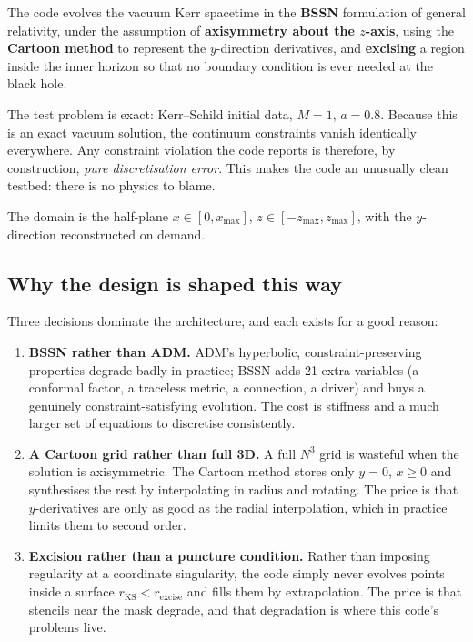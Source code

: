 The code evolves the vacuum Kerr spacetime in the \textbf{BSSN} formulation of
general relativity, under the assumption of \textbf{axisymmetry about the
$z$-axis}, using the \textbf{Cartoon method} to represent the $y$-direction
derivatives, and \textbf{excising} a region inside the inner horizon so that no
boundary condition is ever needed at the black hole.

The test problem is exact: Kerr--Schild initial data, $M=1$, $a=0.8$. Because
this is an exact vacuum solution, the continuum constraints vanish identically
everywhere. Any constraint violation the code reports is therefore, by
construction, \emph{pure discretisation error}. This makes the code an
unusually clean testbed: there is no physics to blame.

The domain is the half-plane $x \in [0, x_{\max}]$, $z \in [-z_{\max},
z_{\max}]$, with the $y$-direction reconstructed on demand.

\subsection{Why the design is shaped this way}

Three decisions dominate the architecture, and each exists for a good reason:

\begin{enumerate}
\item \textbf{BSSN rather than ADM.} ADM's hyperbolic, constraint-preserving
      properties degrade badly in practice; BSSN adds 21 extra variables (a
      conformal factor, a traceless metric, a connection, a driver) and buys a
      genuinely constraint-satisfying evolution. The cost is stiffness and a
      much larger set of equations to discretise consistently.
\item \textbf{A Cartoon grid rather than full 3D.} A full
      $N^3$ grid is wasteful when the solution is axisymmetric. The Cartoon
      method stores only $y=0$, $x \geq 0$ and synthesises the rest by
      interpolating in radius and rotating. The price is that $y$-derivatives
      are only as good as the radial interpolation, which in practice limits
      them to second order.
\item \textbf{Excision rather than a puncture condition.} Rather than imposing
      regularity at a coordinate singularity, the code simply never evolves
      points inside a surface $r_{\mathrm{KS}} < r_{\mathrm{excise}}$ and
      fills them by extrapolation. The price is that stencils near the mask
      degrade, and that degradation is where this code's problems live.
\end{enumerate}

